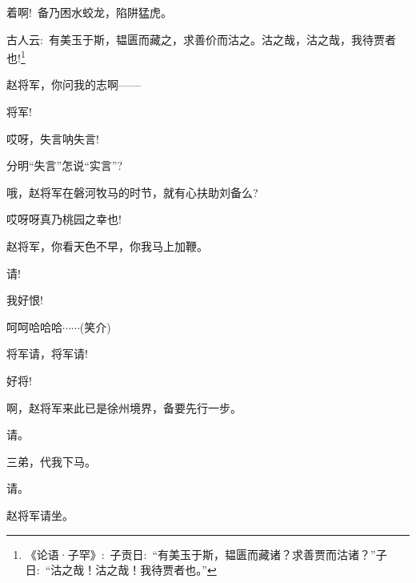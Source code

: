 {{着啊!~备乃困水蛟龙，陷阱猛虎。}

{古人云:~有美玉于斯，韫匮而藏之，求善价而沽之。沽之哉，沽之哉，我待贾者也!}\footnote{《论语·子罕》:~子贡日:~``有美玉于斯，韫匮而藏诸？求善贾而沽诸？''子日:~``沽之哉！沽之哉！我待贾者也。''}



{赵将军，你问我的志啊------}

{将军!}


{哎呀，失言呐失言!}

{分明``失言''怎说``实言''?}

{哦，赵将军在磐河牧马的时节，就有心扶助刘备么?}

{哎呀呀真乃桃园之幸也!}

{赵将军，你看天色不早，你我马上加鞭。}

{请!}


{我好恨!}


{呵呵哈哈哈$\cdots{}\cdots{}$({\hwfs 笑介})}


{\vspace{5pt}}

将军{请，将军请!}

{好将!}

{\vspace{5pt}}

{啊，赵将军来此已是徐州境界，备要先行一步。}

{请。}

{三弟，代我下马。}

{请。}

{\vspace{5pt}}

{赵将军请坐。}

}

